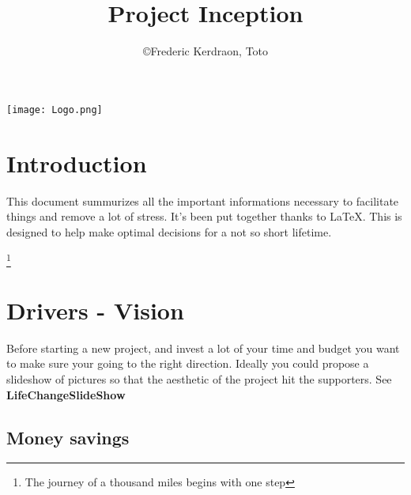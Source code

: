 \documentclass[8pt]{article} %
\title{Project Inception}
\author{\copyright Frederic Kerdraon, Toto}
\begin{document}
\maketitle
\hspace*{-1cm}\texttt{[image: Logo.png]}
\tableofcontents

\section{Introduction}

This document summurizes all the important informations necessary to facilitate things and remove a lot of stress. It's been put together thanks to \LaTeX. This is designed to help make optimal decisions for a not so short lifetime.

\footnote{The journey of a thousand miles begins with one step}
%


\newcommand{\slice}[4]{
  \pgfmathparse{0.5*#1+0.5*#2}
  \let\midangle\pgfmathresult

   slice
  \draw[thick,fill=black!10] (0,0) -- (#1:1) arc (#1:#2:1) -- cycle;

   outer label
  \node[label=\midangle:#4] at (\midangle:1) {};

   inner label
  \pgfmathparse{min((#2-#1-10)/110*(-0.3),0)}
  \let\temp\pgfmathresult
  \pgfmathparse{max(\temp,-0.5) + 0.8}
  \let\innerpos\pgfmathresult
  \node at (\midangle:\innerpos) {#3};
}

\section{Drivers - Vision}
Before starting a new project, and invest a lot of your time and budget you want to make sure your going to the right direction. 
Ideally you could propose a slideshow of pictures so that the aesthetic of the project hit the supporters.
See \textbf{LifeChangeSlideShow}
\subsection{Money savings}
\end{document}

